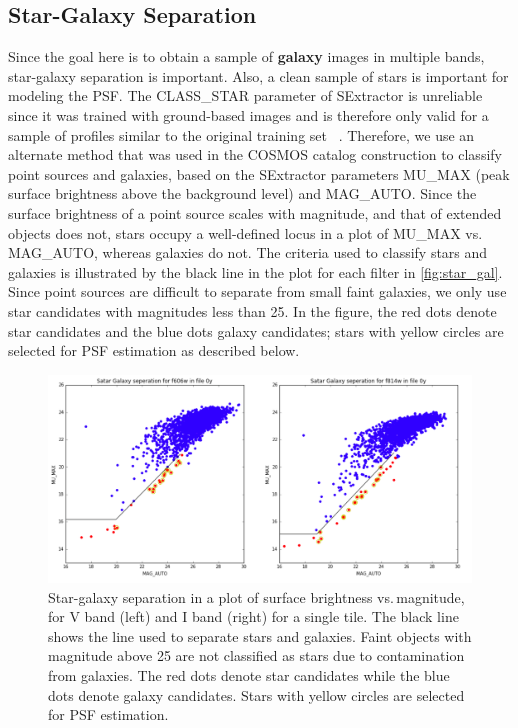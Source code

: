 \documentclass[a4paper,11pt]{article}
\begin{document}
\subsection{Star-Galaxy Separation}
Since the goal here is to obtain a sample of \textbf{galaxy} images in multiple bands, star-galaxy separation is important. Also, a clean sample of stars is important for modeling the PSF. 
The CLASS\_STAR parameter of SExtractor is unreliable since it was trained with ground-based images and is therefore only valid for a sample of profiles similar to the original training set ~\citep{Leauthaud2007}. Therefore, we use an  alternate method that was used in the COSMOS catalog construction to classify point sources and galaxies, based on the SExtractor parameters MU\_MAX (peak surface brightness above the background level) and MAG\_AUTO. 
Since the surface brightness of a point source scales with magnitude, and that of extended objects does not, stars occupy a well-defined locus in a plot of MU\_MAX vs.\,MAG\_AUTO, whereas galaxies do not.
The criteria used to classify stars and galaxies is illustrated by the black line in the plot for each filter in  \autoref{fig:star_gal}. 
Since point sources are difficult to separate from small faint galaxies, we only use star candidates with magnitudes less than 25. In the figure, the red dots denote star candidates and the blue dots galaxy candidates; stars with yellow circles are selected for PSF estimation as described below.

\begin{figure}[h]
\centering\includegraphics[width=1.\linewidth]{star_gal_04.png}
\caption{Star-galaxy separation in a plot of surface brightness vs.\,magnitude, for V band (left) and I band (right) for a single tile. 
The black line shows the line used to separate stars and galaxies.
Faint objects with magnitude above 25 are not classified as stars due to contamination from galaxies.
The red dots denote star candidates while the blue dots denote galaxy candidates.  
Stars with yellow circles are selected for PSF estimation.}
\label{fig:star_gal}
\end{figure}
\end{document}
